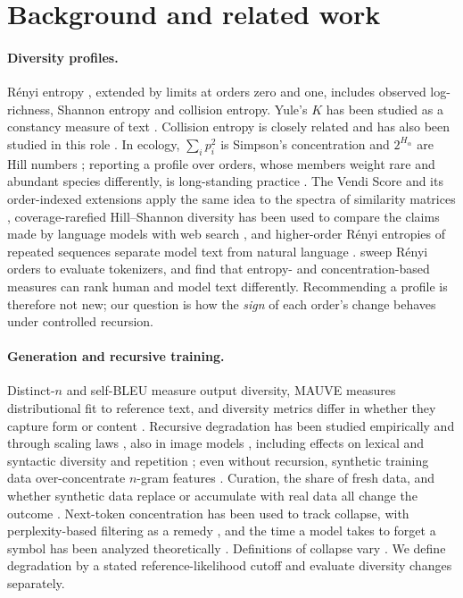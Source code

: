 \documentclass[10pt]{article}
\theoremstyle{plain}
\theoremstyle{definition}
\begin{document}
\section{Background and related work}
\label{sec:related}

\paragraph{Diversity profiles.} R\'enyi entropy \citep{renyi1961}, extended by limits at orders zero
and one, includes observed log-richness, Shannon entropy \citep{shannon1948} and collision entropy. Yule's $K$ has been studied as a constancy measure of text \citep{tweedie1998}. Collision
entropy is closely related and has also been studied in this role \citep{tanakaishii2015}. In ecology, $\sum_i p_i^2$ is
Simpson's concentration \citep{simpson1949} and $2^{H_\alpha}$ are Hill numbers
\citep{hill1973,jost2006}; reporting a profile over orders, whose members weight rare and abundant species differently, is
long-standing practice \citep{tothmeresz1995}. The Vendi Score and its order-indexed
extensions apply the same idea to the spectra of similarity matrices
\citep{friedman2023vendi,pasarkar2024cousins}, coverage-rarefied Hill--Shannon diversity has been
used to compare the claims made by language models with web search \citep{wright2026epistemic},
and higher-order R\'enyi entropies of repeated sequences separate model text from natural language
\citep{tanakaishii2026repeated}. \citet{zouhar2023}
sweep R\'enyi orders to evaluate tokenizers, and \citet{france2026} find that entropy- and
concentration-based measures can rank human and model text differently. Recommending a profile
is therefore not new; our question is how the \emph{sign} of each order's change behaves under
controlled recursion.

\paragraph{Generation and recursive training.} Distinct-$n$ \citep{li2016} and self-BLEU
\citep{zhu2018} measure output diversity, MAUVE \citep{pillutla2021} measures distributional
fit to reference text, and diversity metrics differ in whether they capture form or content
\citep{tevet2021diversity}. Recursive degradation has been studied empirically and through
scaling laws \citep{shumailov2024,dohmatob2024}, also in image models \citep{alemohammad2023},
including effects on
lexical and syntactic diversity \citep{guo2024} and repetition \citep{herel2024collapse}; even
without recursion, synthetic training data over-concentrate $n$-gram features \citep{zhu2025synthesize}. Curation, the share of fresh data, and
whether synthetic data replace or accumulate with real data all change the outcome
\citep{ferbach2024curated,briesch2023,gerstgrasser2024collapse,kazdan2025collapse}.
Next-token concentration has been used to track collapse, with perplexity-based filtering as a
remedy \citep{gambetta2026surprise}, and the time a model takes to forget a symbol has been
analyzed theoretically \citep{suresh2025forgetting}. Definitions of collapse vary
\citep{schaeffer2025position}. We define degradation by a stated reference-likelihood cutoff and
evaluate diversity changes separately.
\end{document}

